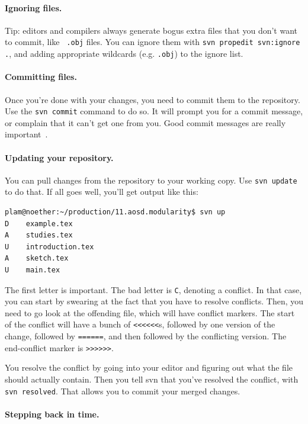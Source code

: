 \paragraph{Ignoring files.} Tip: editors and compilers always
generate bogus extra files that you don't want to commit, like {\tt
  .obj} files. You can ignore them with
\verb+svn propedit svn:ignore .+, and adding appropriate wildcards
(e.g. {\tt *.obj}) to the ignore list.

\paragraph{Committing files.} Once you're done with your changes,
you need to commit them to the repository. Use the {\tt svn commit}
command to do so. It will prompt you for a commit message, or complain
that it can't get one from you. Good commit messages
are really important~\cite{commit}.

\paragraph{Updating your repository.} You can pull changes from
the repository to your working copy. Use {\tt svn update} to do that.
If all goes well, you'll get output like this:

{
\begin{verbatim}
plam@noether:~/production/11.aosd.modularity$ svn up
D    example.tex
A    studies.tex
U    introduction.tex
A    sketch.tex
U    main.tex
\end{verbatim}
}
The first letter is important. The bad letter is {\tt C}, denoting a
conflict. In that case, you can start by swearing at the fact that you
have to resolve conflicts. Then, you need to go look at the offending
file, which will have conflict markers. The start of the conflict will
have a bunch of \verb+<<<<<<+s, followed by one version of the change,
followed by \verb+======+, and then followed by the conflicting
version. The end-conflict marker is \verb+>>>>>>+.

You resolve the conflict by going into your editor and figuring out
what the file should actually contain. Then you tell svn that you've
resolved the conflict, with {\tt svn resolved}. That allows you to
commit your merged changes.

\paragraph{Stepping back in time.}

